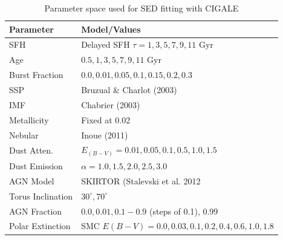 \begin{table}[htbp]
\centering
\caption{Parameter space used for SED fitting with CIGALE}
\label{tab:parameter_space}
\begin{tabular}{ll}
\hline
\textbf{Parameter}          & \textbf{Model/Values}                                                           \\ \hline
SFH                         & Delayed SFH $\tau = 1,3,5,7,9,11$ Gyr                                           \\
Age                         & $0.5, 1, 3, 5, 7, 9, 11$ Gyr                                                   \\
Burst Fraction              & $0.0, 0.01, 0.05, 0.1, 0.15, 0.2, 0.3$                                         \\
SSP                         & Bruzual \& Charlot (2003)                                                      \\
IMF                         & Chabrier (2003)                                                             \\
Metallicity                 & Fixed at 0.02                                                                  \\
Nebular                     & Inoue (2011)                                                                   \\
Dust Atten.                 & \cite{calzetti_dust_2000} $E_{(B-V)} = 0.01, 0.05, 0.1, 0.5, 1.0, 1.5$               \\
Dust Emission               & \cite{dale_two-parameter_2014} $\alpha = 1.0, 1.5, 2.0, 2.5, 3.0$                           \\
AGN Model                   & SKIRTOR (Stalevski et al. 2012 \cite{stalevski_dust_2016}                                           \\
Torus Inclination           & $30^\circ, 70^\circ$                                                           \\
AGN Fraction                & $0.0, 0.01, 0.1 - 0.9$ (steps of 0.1), 0.99                                    \\
Polar Extinction            & SMC $E(B-V) = 0.0, 0.03, 0.1, 0.2, 0.4, 0.6, 1.0, 1.8$                   \\
\hline
\end{tabular}
\end{table}

